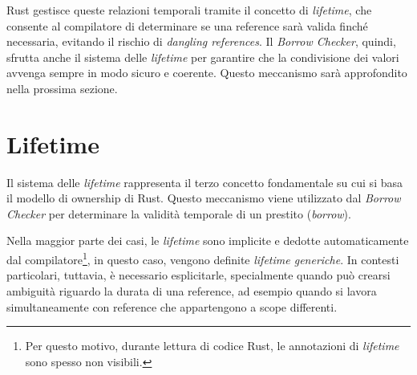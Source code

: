 Rust gestisce queste relazioni temporali tramite il concetto di \textit{lifetime}, che consente al compilatore di determinare se una reference sarà valida finché necessaria, evitando il rischio di \textit{dangling references}. \hfill \break \break
Il \textit{Borrow Checker}, quindi, sfrutta anche il sistema delle \textit{lifetime} per garantire che la condivisione dei valori avvenga sempre in modo sicuro e coerente. Questo meccanismo sarà approfondito nella prossima sezione.

\section{Lifetime}
Il sistema delle \textit{lifetime} rappresenta il terzo concetto fondamentale su cui si basa il modello di ownership di Rust. Questo meccanismo viene utilizzato dal \textit{Borrow Checker} per determinare la validità temporale di un prestito (\textit{borrow}).

Nella maggior parte dei casi, le \textit{lifetime} sono implicite e dedotte automaticamente dal compilatore\footnote{Per questo motivo, durante lettura di codice Rust, le annotazioni di \textit{lifetime} sono spesso non visibili.}, in questo caso, vengono definite \textit{lifetime generiche}. In contesti particolari, tuttavia, è necessario esplicitarle, specialmente quando può crearsi ambiguità riguardo la durata di una reference, ad esempio quando si lavora simultaneamente con reference che appartengono a scope differenti.

